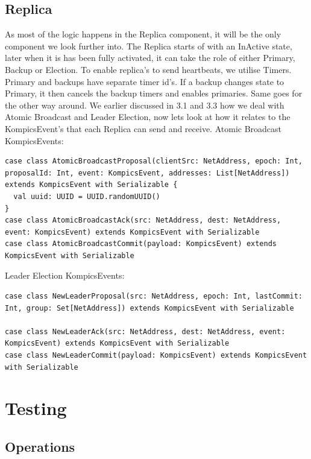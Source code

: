 \documentclass[12pt]{article}
\begin{document}
\subsection{Replica}
As most of the logic happens in the Replica component, it will be the only component we look further into.
\newline{}\newline{}
The Replica starts of with an InActive state, later when it is has been fully activated, it can take the role of either Primary, Backup or Election. To enable replica's to send heartbeats, we utilise Timers. Primary and backups have separate timer id's. If a backup changes state to Primary, it then cancels the backup timers and enables primaries. Same goes for the other way around. We earlier discussed in 3.1 and 3.3 how we deal with Atomic Broadcast and Leader Election, now lets look at how it relates to the KompicsEvent's that each Replica can send and receive.
\newline{}\newline{}
Atomic Broadcast KompicsEvents:
\begin{lstlisting}[style=myScalastyle]
case class AtomicBroadcastProposal(clientSrc: NetAddress, epoch: Int, proposalId: Int, event: KompicsEvent, addresses: List[NetAddress]) extends KompicsEvent with Serializable {
  val uuid: UUID = UUID.randomUUID()
}
case class AtomicBroadcastAck(src: NetAddress, dest: NetAddress, event: KompicsEvent) extends KompicsEvent with Serializable
case class AtomicBroadcastCommit(payload: KompicsEvent) extends KompicsEvent with Serializable

\end{lstlisting}
Leader Election KompicsEvents:
\begin{lstlisting}[style=myScalastyle]
case class NewLeaderProposal(src: NetAddress, epoch: Int, lastCommit: Int, group: Set[NetAddress]) extends KompicsEvent with Serializable

case class NewLeaderAck(src: NetAddress, dest: NetAddress, event: KompicsEvent) extends KompicsEvent with Serializable
case class NewLeaderCommit(payload: KompicsEvent) extends KompicsEvent with Serializable
\end{lstlisting}

\section{Testing}

\subsection{Operations}
\end{document}
